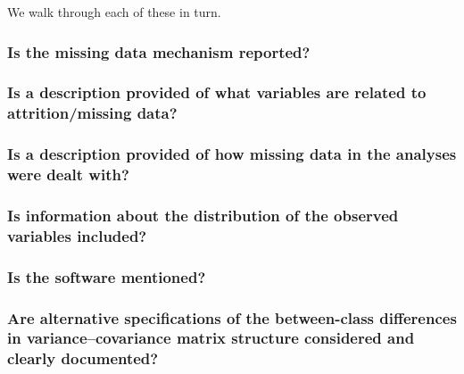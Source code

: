 \documentclass[man]{apa6}
\begin{document}
We walk through each of these in turn.

\hypertarget{is-the-missing-data-mechanism-reported}{%
\subsubsection{Is the missing data mechanism reported?}\label{is-the-missing-data-mechanism-reported}}

\hypertarget{is-a-description-provided-of-what-variables-are-related-to-attritionmissing-data}{%
\subsubsection{Is a description provided of what variables are related to attrition/missing data?}\label{is-a-description-provided-of-what-variables-are-related-to-attritionmissing-data}}

\hypertarget{is-a-description-provided-of-how-missing-data-in-the-analyses-were-dealt-with}{%
\subsubsection{Is a description provided of how missing data in the analyses were dealt with?}\label{is-a-description-provided-of-how-missing-data-in-the-analyses-were-dealt-with}}

\hypertarget{is-information-about-the-distribution-of-the-observed-variables-included}{%
\subsubsection{Is information about the distribution of the observed variables included?}\label{is-information-about-the-distribution-of-the-observed-variables-included}}

\hypertarget{is-the-software-mentioned}{%
\subsubsection{Is the software mentioned?}\label{is-the-software-mentioned}}

\hypertarget{are-alternative-specifications-of-the-between-class-differences-in-variancecovariance-matrix-structure-considered-and-clearly-documented}{%
\subsubsection{Are alternative specifications of the between-class differences in variance--covariance matrix structure considered and clearly documented?}\label{are-alternative-specifications-of-the-between-class-differences-in-variancecovariance-matrix-structure-considered-and-clearly-documented}}
\end{document}
